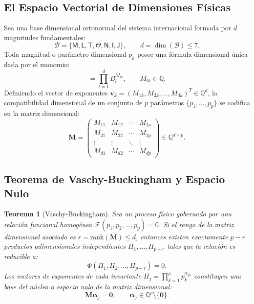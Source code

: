 \documentclass[11pt,a4paper]{article}
\newtheorem{teorema}{Teorema}
\begin{document}
\subsection{El Espacio Vectorial de Dimensiones Físicas}
Sea una base dimensional ortonormal del sistema internacional formada por $d$ magnitudes fundamentales:
\begin{equation}
\mathcal{B} = \{\mathsf{M}, \mathsf{L}, \mathsf{T}, \mathsf{\Theta}, \mathsf{N}, \mathsf{I}, \mathsf{J}\}, \qquad d = \dim(\mathcal{B}) \le 7.
\end{equation}
Toda magnitud o parámetro dimensional $p_k$ posee una fórmula dimensional única dada por el monomio:
\begin{equation}
[p_k] = \prod_{l=1}^d B_l^{M_{lk}}, \qquad M_{lk} \in \mathbb{Q}.
\end{equation}
Definiendo el vector de exponentes $\mathbf{v}_k = (M_{1k}, M_{2k}, \dots, M_{dk})^T \in \mathbb{Q}^d$, la compatibilidad dimensional de un conjunto de $p$ parámetros $\{p_1, \dots, p_p\}$ se codifica en la matriz dimensional:
\begin{equation}
\mathbf{M} = \begin{pmatrix} M_{11} & M_{12} & \cdots & M_{1p} \\ M_{21} & M_{22} & \cdots & M_{2p} \\ \vdots & \vdots & \ddots & \vdots \\ M_{d1} & M_{d2} & \cdots & M_{dp} \end{pmatrix} \in \mathbb{Q}^{d \times p}.
\end{equation}

\subsection{Teorema de Vaschy-Buckingham y Espacio Nulo}
\begin{teorema}[Vaschy-Buckingham]
Sea un proceso físico gobernado por una relación funcional homogénea $\mathcal{F}(p_1, p_2, \dots, p_p) = 0$. Si el rango de la matriz dimensional asociada es $r = \mathrm{rank}(\mathbf{M}) \le d$, entonces existen exactamente $p - r$ productos adimensionales independientes $\Pi_1, \dots, \Pi_{p-r}$ tales que la relación es reducible a:
\begin{equation}
\Phi(\Pi_1, \Pi_2, \dots, \Pi_{p-r}) = 0.
\end{equation}
Los vectores de exponentes de cada invariante $\Pi_j = \prod_{k=1}^p p_k^{\alpha_{jk}}$ constituyen una base del núcleo o espacio nulo de la matriz dimensional:
\begin{equation}
\mathbf{M} \boldsymbol{\alpha}_j = \mathbf{0}, \qquad \boldsymbol{\alpha}_j \in \mathbb{Q}^p \setminus \{\mathbf{0}\}.
\end{equation}
\end{teorema}
\end{document}
